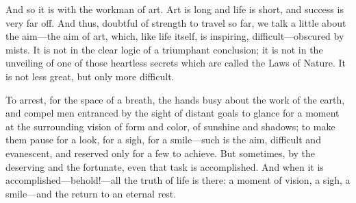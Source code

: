 And so it is with the workman of art. Art is long and life is short, and
success is very far off. And thus, doubtful of strength to travel so
far, we talk a little about the aim---the aim of art, which, like life
itself, is inspiring, difficult---obscured by mists. It is not in the
clear logic of a triumphant conclusion; it is not in the unveiling of
one of those heartless secrets which are called the Laws of Nature. It
is not less great, but only more difficult.

To arrest, for the space of a breath, the hands busy about the work of
the earth, and compel men entranced by the sight of distant goals to
glance for a moment at the surrounding vision of form and color, of
sunshine and shadows; to make them pause for a look, for a sigh, for a
smile---such is the aim, difficult and evanescent, and reserved only for
a few to achieve. But sometimes, by the deserving and the fortunate,
even that task is accomplished. And when it is
accomplished---behold!---all the truth of life is there: a moment of
vision, a sigh, a smile---and the return to an eternal rest.

